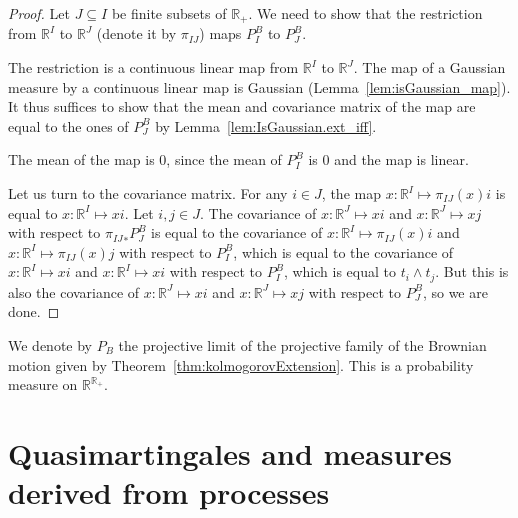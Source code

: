 \begin{proof}\leanok
Let $J \subseteq I$ be finite subsets of $\mathbb{R}_+$.
We need to show that the restriction from $\mathbb{R}^I$ to $\mathbb{R}^J$ (denote it by $\pi_{IJ}$) maps $P^B_I$ to $P^B_J$.

The restriction is a continuous linear map from $\mathbb{R}^I$ to $\mathbb{R}^J$.
The map of a Gaussian measure by a continuous linear map is Gaussian (Lemma~\ref{lem:isGaussian_map}).
It thus suffices to show that the mean and covariance matrix of the map are equal to the ones of $P^B_J$ by Lemma~\ref{lem:IsGaussian.ext_iff}.

The mean of the map is $0$, since the mean of $P^B_I$ is $0$ and the map is linear.

Let us turn to the covariance matrix. For any $i \in J$, the map $x : \mathbb{R}^I \mapsto \pi_{IJ}(x) i$ is equal to $x : \mathbb{R}^I \mapsto x i$. Let $i, j \in J$. The covariance of $x : \mathbb{R}^J \mapsto x i$ and $x : \mathbb{R}^J \mapsto x j$ with respect to ${\pi_{IJ}}_*P^B_J$ is equal to the covariance of $x : \mathbb{R}^I \mapsto \pi_{IJ}(x) i$ and $x : \mathbb{R}^I \mapsto \pi_{IJ}(x) j$ with respect to $P^B_I$, which is equal to the covariance of $x : \mathbb{R}^I \mapsto x i$ and $x : \mathbb{R}^I \mapsto x i$ with respect to $P^B_I$, which is equal to $t_i \land t_j$. But this is also the covariance of $x : \mathbb{R}^J \mapsto x i$ and $x : \mathbb{R}^J \mapsto x j$ with respect to $P^B_J$, so we are done.
\end{proof}


\begin{definition}\label{def:gaussianLimit}
  \leanok
We denote by $P_B$ the projective limit of the projective family of the Brownian motion given by Theorem~\ref{thm:kolmogorovExtension}.
This is a probability measure on $\mathbb{R}^{\mathbb{R}_+}$.
\end{definition}


\chapter{Quasimartingales and measures derived from processes}


